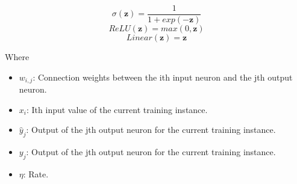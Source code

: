 \documentclass[12pt]{article}
\begin{document}
\begin{multicols}{3}
	\noindent
	\begin{equation}
		\sigma(\textbf{z})=\frac{1}{1+ exp(-\textbf{z})} 
		\label{logistic-activation-function}
    \end{equation}
    \begin{equation}
		ReLU(\textbf{z}) = max(0,\textbf{z})
		\label{relu-activation-function}
	\end{equation}
	\begin{equation}
		Linear(\textbf{z}) = \textbf{z}
		\label{linear-activation-function}
	\end{equation}
\end{multicols}
Where
\singlespacing
\begin{itemize}
	\item $w_{i,j}$: Connection weights between the ith input neuron and the jth output neuron. 
	\item $x_i$: Ith input value of the current training instance.
	\item $\hat{y}_{j}$: Output of the jth output neuron for the current training instance.
	\item $y_{j}$: Output of the jth output neuron for the current training instance.
	\item $\eta$: Rate.
\end{itemize}
\doublespacing
\end{document}
